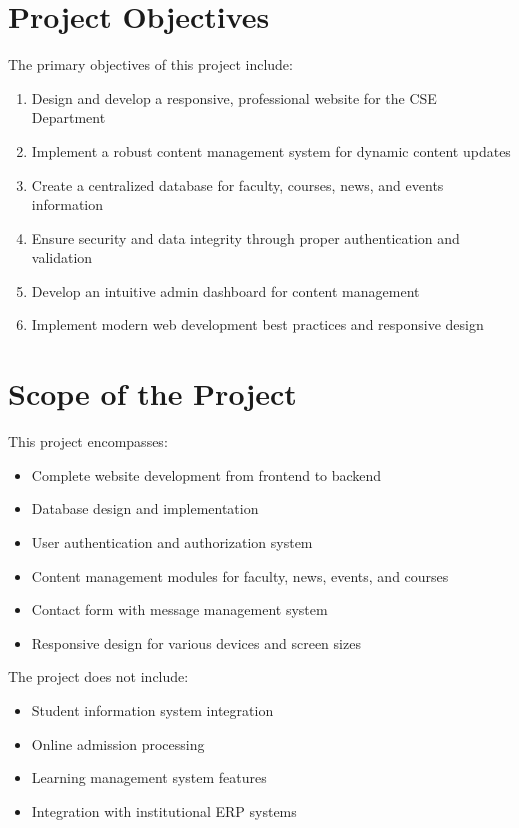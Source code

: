 \documentclass[12pt,a4paper]{report}
\begin{document}
\section{Project Objectives}
The primary objectives of this project include:
\begin{enumerate}
    \item Design and develop a responsive, professional website for the CSE Department
    \item Implement a robust content management system for dynamic content updates
    \item Create a centralized database for faculty, courses, news, and events information
    \item Ensure security and data integrity through proper authentication and validation
    \item Develop an intuitive admin dashboard for content management
    \item Implement modern web development best practices and responsive design
\end{enumerate}

\section{Scope of the Project}
This project encompasses:
\begin{itemize}
    \item Complete website development from frontend to backend
    \item Database design and implementation
    \item User authentication and authorization system
    \item Content management modules for faculty, news, events, and courses
    \item Contact form with message management system
    \item Responsive design for various devices and screen sizes
\end{itemize}

The project does not include:
\begin{itemize}
    \item Student information system integration
    \item Online admission processing
    \item Learning management system features
    \item Integration with institutional ERP systems
\end{itemize}
\end{document}

